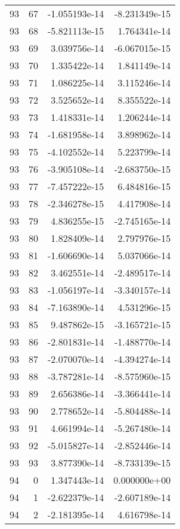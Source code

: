 \begin{tabular}{rrrr}
  93 &   67 & -1.055193e-14 & -8.231349e-15 \\
  93 &   68 & -5.821113e-15 &  1.764341e-14 \\
  93 &   69 &  3.039756e-14 & -6.067015e-15 \\
  93 &   70 &  1.335422e-14 &  1.841149e-14 \\
  93 &   71 &  1.086225e-14 &  3.115246e-14 \\
  93 &   72 &  3.525652e-14 &  8.355522e-14 \\
  93 &   73 &  1.418331e-14 &  1.206244e-14 \\
  93 &   74 & -1.681958e-14 &  3.898962e-14 \\
  93 &   75 & -4.102552e-14 &  5.223799e-14 \\
  93 &   76 & -3.905108e-14 & -2.683750e-15 \\
  93 &   77 & -7.457222e-15 &  6.484816e-15 \\
  93 &   78 & -2.346278e-15 &  4.417908e-14 \\
  93 &   79 &  4.836255e-15 & -2.745165e-14 \\
  93 &   80 &  1.828409e-14 &  2.797976e-15 \\
  93 &   81 & -1.606690e-14 &  5.037066e-14 \\
  93 &   82 &  3.462551e-14 & -2.489517e-14 \\
  93 &   83 & -1.056197e-14 & -3.340157e-14 \\
  93 &   84 & -7.163890e-14 &  4.531296e-15 \\
  93 &   85 &  9.487862e-15 & -3.165721e-15 \\
  93 &   86 & -2.801831e-14 & -1.488770e-14 \\
  93 &   87 & -2.070070e-14 & -4.394274e-14 \\
  93 &   88 & -3.787281e-14 & -8.575960e-15 \\
  93 &   89 &  2.656386e-14 & -3.366441e-14 \\
  93 &   90 &  2.778652e-14 & -5.804488e-14 \\
  93 &   91 &  4.661994e-14 & -5.267480e-14 \\
  93 &   92 & -5.015827e-14 & -2.852446e-14 \\
  93 &   93 &  3.877390e-14 & -8.733139e-15 \\
  94 &    0 &  1.347443e-14 &  0.000000e+00 \\
  94 &    1 & -2.622379e-14 & -2.607189e-14 \\
  94 &    2 & -2.181395e-14 &  4.616798e-14 \\

\end{tabular}
